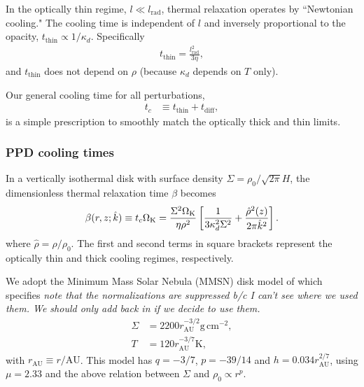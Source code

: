In the optically thin regime, $l\ll 
l_\mathrm{rad}$, thermal relaxation operates by ``Newtonian cooling."
The cooling time is independent of $l$ and 
inversely proportional to the opacity, $t_\mathrm{thin} \propto 1/\kappa_d$. 
Specifically 
\begin{align}
  t_\mathrm{thin} = \frac{l_\mathrm{rad}^2}{3\eta},
\end{align}
and $t_\mathrm{thin}$ does not depend on $\rho$ (because $\kappa_d$ depends on $T$ only). 

Our general cooling time for all perturbations,
\begin{align}\label{tc_def}
  t_c &\equiv t_\mathrm{thin} + t _\mathrm{diff},%
\end{align}
is a simple prescription to smoothly match the optically thick and thin limits.

\subsubsection{PPD cooling times}\label{toy_relax}
In a vertically isothermal disk with surface density $\Sigma = \rho_0/\sqrt{2\pi}H$, 
the dimensionless thermal
relaxation time $\beta$ becomes 
\begin{align}\label{real_beta}
  \beta(r,z;\hat{k}) \equiv t_c\Omega_{\rm K} =
  \frac{\Sigma^2\Omega_{\rm K}}{\eta\rho^2}\left[\frac{1}{3\kappa_d^2\Sigma^2} 
    + \frac{\hat{\rho}^2(z)}{2\pi \hat{k}^2}\right].
\end{align}
where $\hat{\rho} = \rho/\rho_0$.  The first and second terms in square brackets represent the optically thin and thick cooling regimes, respectively.

We adopt the Minimum Mass Solar Nebula
(MMSN) disk model of \cite{chiang10} which specifies
\emph{note that the normalizations are suppressed b/c I can't see where we used them.  We should only add back in if we decide to use them.}
\begin{subequations}
\begin{align}
\label{mmsn_sigma}
  \Sigma &= 2200 %
 r_\mathrm{AU}^{-3/2} \mathrm{g}\,\mathrm{cm}^{-2},  \\
 T &= 120%
  r_\mathrm{AU}^{-3/7} \mathrm{K}, \label{mmsn_temp}  
\end{align}\end{subequations}
with $r_\mathrm{AU}\equiv r/\mathrm{AU}$.  This model has $q = -3/7$, $p = -39/14$ and $h  = 0.034 r_\mathrm{AU}^{2/7}$, using $\mu = 2.33$ and the above relation between $\Sigma$ and $\rho_0 \propto r^p$.  

